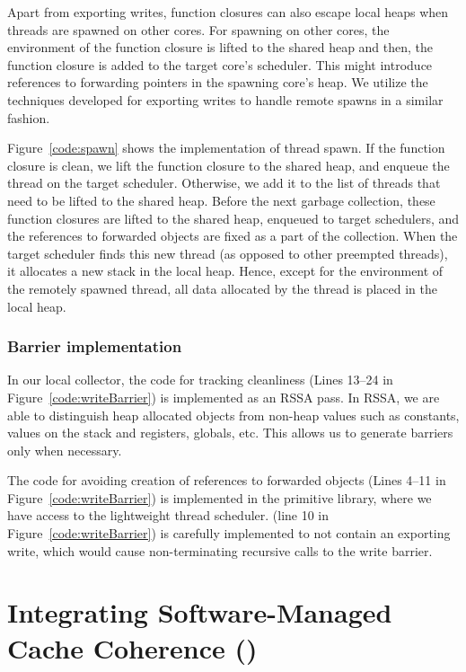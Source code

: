 Apart from exporting writes, function closures can also escape local heaps when
threads are spawned on other cores. For spawning on other cores, the
environment of the function closure is lifted to the shared heap and then, the
function closure is added to the target core's scheduler. This might introduce
references to forwarding pointers in the spawning core's heap. We utilize the
techniques developed for exporting writes to handle remote spawns in a similar
fashion.

Figure~\ref{code:spawn} shows the implementation of thread spawn. If the
function closure is clean, we lift the function closure to the shared heap, and
enqueue the thread on the target scheduler. Otherwise, we add it to the list of
threads that need to be lifted to the shared heap. Before the next garbage
collection, these function closures are lifted to the shared heap, enqueued to
target schedulers, and the references to forwarded objects are fixed as a part
of the collection. When the target scheduler finds this new thread (as opposed
to other preempted threads), it allocates a new stack in the local heap. Hence,
except for the environment of the remotely spawned thread, all data allocated
by the thread is placed in the local heap.

\subsubsection{Barrier implementation}

In our local collector, the code for tracking cleanliness (Lines 13--24 in
Figure~\ref{code:writeBarrier}) is implemented as an RSSA pass. In RSSA, we are
able to distinguish heap allocated objects from non-heap values such as
constants, values on the stack and registers, globals, etc. This allows us to
generate barriers only when necessary.

The code for avoiding creation of references to forwarded objects (Lines 4--11
in Figure~\ref{code:writeBarrier}) is implemented in the primitive library,
where we have access to the lightweight thread scheduler.
 (line 10 in Figure~\ref{code:writeBarrier}) is
carefully implemented to not contain an exporting write, which would cause
non-terminating recursive calls to the write barrier.

\section{Integrating Software-Managed Cache Coherence (\smc)}

